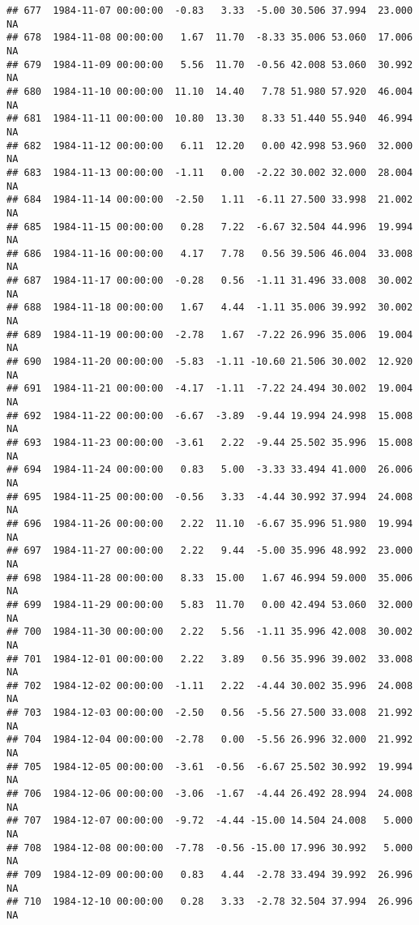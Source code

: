 \documentclass{article}\usepackage{graphicx, color}
\makeatletter
\newenvironment{kframe}{%
 \def\at@end@of@kframe{}%
 \ifinner\ifhmode%
  \def\at@end@of@kframe{\end{minipage}}%
  \begin{minipage}{\columnwidth}%
 \fi\fi%
 \def\FrameCommand##1{\hskip\@totalleftmargin \hskip-\fboxsep
 \colorbox{shadecolor}{##1}\hskip-\fboxsep
     \hskip-\linewidth \hskip-\@totalleftmargin \hskip\columnwidth}%
 \MakeFramed {\advance\hsize-\width
   \@totalleftmargin\z@ \linewidth\hsize
   \@setminipage}}%
 {\par\unskip\endMakeFramed%
 \at@end@of@kframe}
\newenvironment{knitrout}{}{} %
\makeatother
\begin{document}
\begin{knitrout}
\begin{kframe}
\begin{verbatim}
## 677  1984-11-07 00:00:00  -0.83   3.33  -5.00 30.506 37.994  23.000     NA
## 678  1984-11-08 00:00:00   1.67  11.70  -8.33 35.006 53.060  17.006     NA
## 679  1984-11-09 00:00:00   5.56  11.70  -0.56 42.008 53.060  30.992     NA
## 680  1984-11-10 00:00:00  11.10  14.40   7.78 51.980 57.920  46.004     NA
## 681  1984-11-11 00:00:00  10.80  13.30   8.33 51.440 55.940  46.994     NA
## 682  1984-11-12 00:00:00   6.11  12.20   0.00 42.998 53.960  32.000     NA
## 683  1984-11-13 00:00:00  -1.11   0.00  -2.22 30.002 32.000  28.004     NA
## 684  1984-11-14 00:00:00  -2.50   1.11  -6.11 27.500 33.998  21.002     NA
## 685  1984-11-15 00:00:00   0.28   7.22  -6.67 32.504 44.996  19.994     NA
## 686  1984-11-16 00:00:00   4.17   7.78   0.56 39.506 46.004  33.008     NA
## 687  1984-11-17 00:00:00  -0.28   0.56  -1.11 31.496 33.008  30.002     NA
## 688  1984-11-18 00:00:00   1.67   4.44  -1.11 35.006 39.992  30.002     NA
## 689  1984-11-19 00:00:00  -2.78   1.67  -7.22 26.996 35.006  19.004     NA
## 690  1984-11-20 00:00:00  -5.83  -1.11 -10.60 21.506 30.002  12.920     NA
## 691  1984-11-21 00:00:00  -4.17  -1.11  -7.22 24.494 30.002  19.004     NA
## 692  1984-11-22 00:00:00  -6.67  -3.89  -9.44 19.994 24.998  15.008     NA
## 693  1984-11-23 00:00:00  -3.61   2.22  -9.44 25.502 35.996  15.008     NA
## 694  1984-11-24 00:00:00   0.83   5.00  -3.33 33.494 41.000  26.006     NA
## 695  1984-11-25 00:00:00  -0.56   3.33  -4.44 30.992 37.994  24.008     NA
## 696  1984-11-26 00:00:00   2.22  11.10  -6.67 35.996 51.980  19.994     NA
## 697  1984-11-27 00:00:00   2.22   9.44  -5.00 35.996 48.992  23.000     NA
## 698  1984-11-28 00:00:00   8.33  15.00   1.67 46.994 59.000  35.006     NA
## 699  1984-11-29 00:00:00   5.83  11.70   0.00 42.494 53.060  32.000     NA
## 700  1984-11-30 00:00:00   2.22   5.56  -1.11 35.996 42.008  30.002     NA
## 701  1984-12-01 00:00:00   2.22   3.89   0.56 35.996 39.002  33.008     NA
## 702  1984-12-02 00:00:00  -1.11   2.22  -4.44 30.002 35.996  24.008     NA
## 703  1984-12-03 00:00:00  -2.50   0.56  -5.56 27.500 33.008  21.992     NA
## 704  1984-12-04 00:00:00  -2.78   0.00  -5.56 26.996 32.000  21.992     NA
## 705  1984-12-05 00:00:00  -3.61  -0.56  -6.67 25.502 30.992  19.994     NA
## 706  1984-12-06 00:00:00  -3.06  -1.67  -4.44 26.492 28.994  24.008     NA
## 707  1984-12-07 00:00:00  -9.72  -4.44 -15.00 14.504 24.008   5.000     NA
## 708  1984-12-08 00:00:00  -7.78  -0.56 -15.00 17.996 30.992   5.000     NA
## 709  1984-12-09 00:00:00   0.83   4.44  -2.78 33.494 39.992  26.996     NA
## 710  1984-12-10 00:00:00   0.28   3.33  -2.78 32.504 37.994  26.996     NA

\end{verbatim}
\end{kframe}
\end{knitrout}
\end{document}
